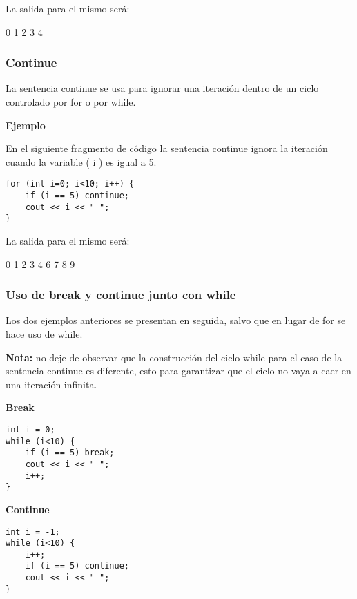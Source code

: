 La salida para el mismo será:

\begin{listing}[style=consola, numbers=none,label=resultado-break,caption=Resultado Break]
0 1 2 3 4
\end{listing}


\subsubsection{Continue}

La sentencia continue se usa para ignorar una iteración dentro de un ciclo controlado por for o por while.

\begin{center}
	\textbf{Ejemplo}
\end{center}

En el siguiente fragmento de código la sentencia continue ignora la iteración cuando la variable ( i ) es igual a 5.

\begin{lstlisting}[style=Cpp, label=continue, caption=Continue]
for (int i=0; i<10; i++) {
    if (i == 5) continue;
    cout << i << " ";
}
\end{lstlisting}

La salida para el mismo será:

\begin{listing}[style=consola, numbers=none,label=resultado-continue,caption=Resultado Continue]
0 1 2 3 4 6 7 8 9
\end{listing}

\subsubsection{Uso de break y continue junto con while}

Los dos ejemplos anteriores se presentan en seguida, salvo que en lugar de for se hace uso de while.

\textbf{Nota:} no deje de observar que la construcción del ciclo while para el caso de la sentencia continue es diferente, esto para garantizar que el ciclo no vaya a caer en una iteración infinita.

\begin{center}
	\textbf{Break}
\end{center}

\begin{lstlisting}[style=Cpp, label=break-while, caption=Break While]
int i = 0;
while (i<10) {
    if (i == 5) break;
    cout << i << " ";
    i++;
}
\end{lstlisting}

\begin{center}
	\textbf{Continue}
\end{center}

\begin{lstlisting}[style=Cpp, label=continue-while, caption=Continue While]
int i = -1;
while (i<10) {
    i++;
    if (i == 5) continue;
    cout << i << " ";
}
\end{lstlisting}
